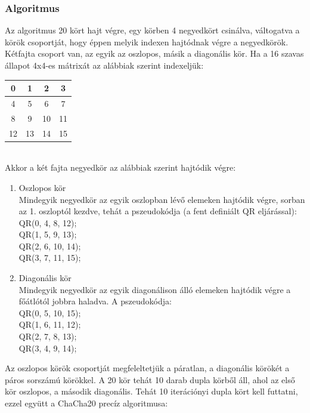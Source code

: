 \documentclass[hidelinks, 12pt]{article}
\begin{document}
	\subsubsection*{Algoritmus}
	
	Az algoritmus 20 kört hajt végre, egy körben 4 negyedkört csinálva, váltogatva a körök csoportját, hogy éppen melyik indexen hajtódnak végre a negyedkörök. Kétfajta csoport van, az egyik az oszlopos, másik a diagonális kör. Ha a 16 szavas állapot 4x4-es mátrixát az alábbiak szerint indexeljük:
	\begin{table}
		[h]
		\centering
		\begin{tabular}{|c|c|c|c|}
			\hline
			0&1&2&3\\\hline
			4&5&6&7\\\hline
			8&9&10&11\\\hline
			12&13&14&15 \\\hline
		\end{tabular}
	\end{table}
	\\
	Akkor a két fajta negyedkör az alábbiak szerint hajtódik végre:
	\begin{enumerate}
		\bfseries\item Oszlopos kör \\
		\normalfont Mindegyik negyedkör az egyik oszlopban lévő elemeken hajtódik végre, sorban az 1. oszloptól kezdve, tehát a pszeudokódja (a fent definiált QR eljárással):
		\\QR(0, 4, 8, 12); \\
		QR(1, 5, 9, 13); \\
		QR(2, 6, 10, 14); \\
		QR(3, 7, 11, 15);
		\bfseries \item Diagonális kör \\
		\normalfont Mindegyik negyedkör az egyik diagonálison álló elemeken hajtódik végre a főátlótól jobbra haladva. A pszeudokódja:
	    \\QR(0, 5, 10, 15); \\
	    QR(1, 6, 11, 12); \\
	    QR(2, 7,  8, 13); \\
	    QR(3, 4,  9, 14); \\
	\end{enumerate}
	Az oszlopos körök csoportját megfeleltetjük a páratlan, a diagonális körökét a páros sorszámú körökkel. A 20 kör tehát 10 darab dupla körből áll, ahol az első kör oszlopos, a második diagonális. Tehát 10 iterációnyi dupla kört kell futtatni, ezzel együtt a ChaCha20 precíz algoritmusa:
\end{document}
